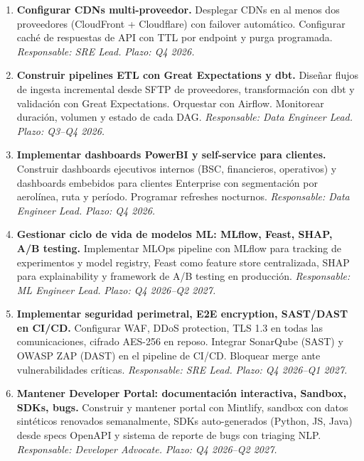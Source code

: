 ﻿\documentclass[11pt, letterpaper]{article}
\begin{document}
\begin{enumerate}[leftmargin=1.5cm, label=\textbf{OT\arabic*}, itemsep=2pt, topsep=4pt]
    \item \textbf{Configurar CDNs multi-proveedor.} Desplegar CDNs en al menos dos proveedores (CloudFront + Cloudflare) con failover automático. Configurar caché de respuestas de API con TTL por endpoint y purga programada. \textit{Responsable: SRE Lead.} \textit{Plazo: Q4 2026.}



    \item \textbf{Construir pipelines ETL con Great Expectations y dbt.} Diseñar flujos de ingesta incremental desde SFTP de proveedores, transformación con dbt y validación con Great Expectations. Orquestar con Airflow. Monitorear duración, volumen y estado de cada DAG. \textit{Responsable: Data Engineer Lead.} \textit{Plazo: Q3--Q4 2026.}



    \item \textbf{Implementar dashboards PowerBI y self-service para clientes.} Construir dashboards ejecutivos internos (BSC, financieros, operativos) y dashboards embebidos para clientes Enterprise con segmentación por aerolínea, ruta y período. Programar refreshes nocturnos. \textit{Responsable: Data Engineer Lead.} \textit{Plazo: Q4 2026.}



    \item \textbf{Gestionar ciclo de vida de modelos ML: MLflow, Feast, SHAP, A/B testing.} Implementar MLOps pipeline con MLflow para tracking de experimentos y model registry, Feast como feature store centralizada, SHAP para explainability y framework de A/B testing en producción. \textit{Responsable: ML Engineer Lead.} \textit{Plazo: Q4 2026--Q2 2027.}



    \item \textbf{Implementar seguridad perimetral, E2E encryption, SAST/DAST en CI/CD.} Configurar WAF, DDoS protection, TLS 1.3 en todas las comunicaciones, cifrado AES-256 en reposo. Integrar SonarQube (SAST) y OWASP ZAP (DAST) en el pipeline de CI/CD. Bloquear merge ante vulnerabilidades críticas. \textit{Responsable: SRE Lead.} \textit{Plazo: Q4 2026--Q1 2027.}



    \item \textbf{Mantener Developer Portal: documentación interactiva, Sandbox, SDKs, bugs.} Construir y mantener portal con Mintlify, sandbox con datos sintéticos renovados semanalmente, SDKs auto-generados (Python, JS, Java) desde specs OpenAPI y sistema de reporte de bugs con triaging NLP. \textit{Responsable: Developer Advocate.} \textit{Plazo: Q4 2026--Q2 2027.}




\end{enumerate}
\end{document}
